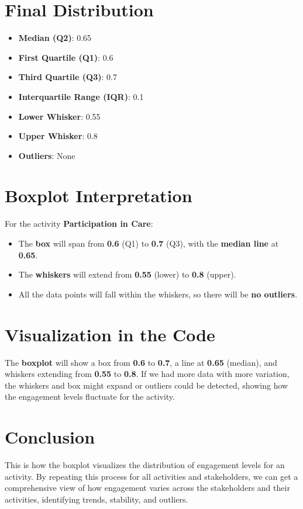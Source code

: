 \documentclass{article}
\begin{document}
	\section*{Final Distribution}
	\begin{itemize}
		\item \textbf{Median (Q2)}: 0.65
		\item \textbf{First Quartile (Q1)}: 0.6
		\item \textbf{Third Quartile (Q3)}: 0.7
		\item \textbf{Interquartile Range (IQR)}: 0.1
		\item \textbf{Lower Whisker}: 0.55
		\item \textbf{Upper Whisker}: 0.8
		\item \textbf{Outliers}: None
	\end{itemize}
	
	\section*{Boxplot Interpretation}
	
	For the activity \textbf{Participation in Care}:
	\begin{itemize}
		\item The \textbf{box} will span from \textbf{0.6} (Q1) to \textbf{0.7} (Q3), with the \textbf{median line} at \textbf{0.65}.
		\item The \textbf{whiskers} will extend from \textbf{0.55} (lower) to \textbf{0.8} (upper).
		\item All the data points will fall within the whiskers, so there will be \textbf{no outliers}.
	\end{itemize}
	
	\section*{Visualization in the Code}
	
	The \textbf{boxplot} will show a box from \textbf{0.6} to \textbf{0.7}, a line at \textbf{0.65} (median), and whiskers extending from \textbf{0.55} to \textbf{0.8}. If we had more data with more variation, the whiskers and box might expand or outliers could be detected, showing how the engagement levels fluctuate for the activity.
	
	\section*{Conclusion}
	This is how the boxplot visualizes the distribution of engagement levels for an activity. By repeating this process for all activities and stakeholders, we can get a comprehensive view of how engagement varies across the stakeholders and their activities, identifying trends, stability, and outliers.
	
\end{document}
